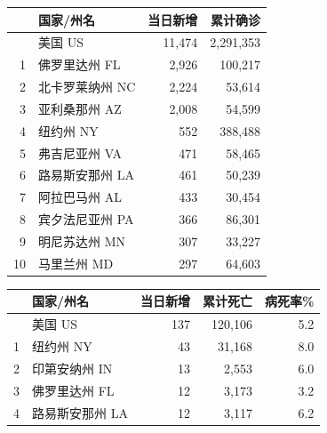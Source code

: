 \documentclass[]{article}
\begin{document}
\begin{table}[H]
    \vspace{-7mm}
    \begin{minipage}{.4\linewidth}
    \caption{美国新增确诊前十位州}
    \vspace{0.5\baselineskip}
      \centering
    \captionsetup{justification=centering} \begin{table}[H]
\centering
\begin{tabular}{rlrr}
\toprule
  & 国家/州名 & 当日新增 & 累计确诊\\
\midrule
\rowcolor{gray!6}   & 美国 US & 11,474 & 2,291,353\\
1 & 佛罗里达州 FL & 2,926 & 100,217\\
\rowcolor{gray!6}  2 & 北卡罗莱纳州 NC & 2,224 & 53,614\\
3 & 亚利桑那州 AZ & 2,008 & 54,599\\
\rowcolor{gray!6}  4 & 纽约州 NY & 552 & 388,488\\
5 & 弗吉尼亚州 VA & 471 & 58,465\\
\rowcolor{gray!6}  6 & 路易斯安那州 LA & 461 & 50,239\\
7 & 阿拉巴马州 AL & 433 & 30,454\\
\rowcolor{gray!6}  8 & 宾夕法尼亚州 PA & 366 & 86,301\\
9 & 明尼苏达州 MN & 307 & 33,227\\
\rowcolor{gray!6}  10 & 马里兰州 MD & 297 & 64,603\\
\bottomrule
\end{tabular}
\end{table} \end{minipage}%
    \begin{minipage}{.7\linewidth}
     \caption{美国新增死亡前十位州}
     \vspace{0.5\baselineskip}
      \centering
    \captionsetup{justification=centering} \begin{table}[H]
\centering
\begin{tabular}{rlrrr}
\toprule
  & 国家/州名 & 当日新增 & 累计死亡 & 病死率\%\\
\midrule
\rowcolor{gray!6}   & 美国 US & 137 & 120,106 & 5.2\\
1 & 纽约州 NY & 43 & 31,168 & 8.0\\
\rowcolor{gray!6}  2 & 印第安纳州 IN & 13 & 2,553 & 6.0\\
3 & 佛罗里达州 FL & 12 & 3,173 & 3.2\\
\rowcolor{gray!6}  4 & 路易斯安那州 LA & 12 & 3,117 & 6.2\\

\end{tabular}
\end{table}
\end{minipage}
\end{table}
\end{document}
